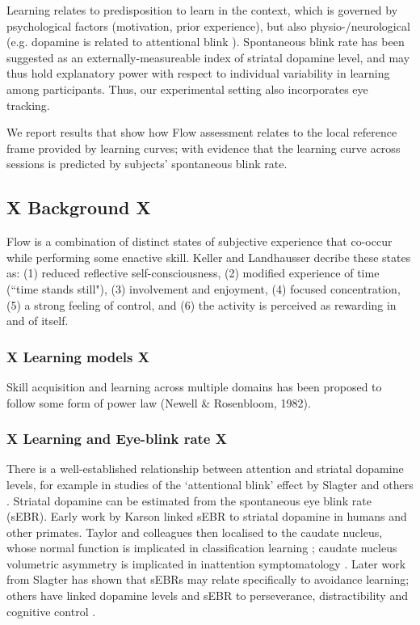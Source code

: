 \documentclass[fleqn,10pt]{wlscirep}
\begin{document}
Learning relates to predisposition to learn in the context, which is governed by psychological factors (motivation, prior experience), but also physio-/neurological (e.g. dopamine is related to attentional blink \cite{Slagter2012}). Spontaneous blink rate has been suggested as an externally-measureable index of striatal dopamine level, and may thus hold explanatory power with respect to individual variability in learning among participants. Thus, our experimental setting also incorporates eye tracking.

We report results that show how Flow assessment relates to the local reference frame provided by learning curves; with evidence that the learning curve across sessions is predicted by subjects' spontaneous blink rate.


\subsection{X Background X}
Flow is a combination of distinct states of subjective experience that co-occur while performing some enactive skill. Keller and Landhausser \cite{Keller2012} decribe these states as: (1) reduced reflective self-consciousness, (2) modified experience of time (``time stands still"), (3) involvement and enjoyment, (4) focused concentration, (5) a strong feeling of control, and (6) the activity is perceived as rewarding in and of itself.

\subsubsection{X Learning models X}
Skill acquisition and learning across multiple domains has been proposed to follow some form of power law (Newell \& Rosenbloom, 1982).%

\subsubsection{X Learning and Eye-blink rate X}
There is a well-established relationship between attention and striatal dopamine levels, for example in studies of the `attentional blink' effect by Slagter and others \cite{Slagter2012,COLZATO2008}. Striatal dopamine can be estimated from the spontaneous eye blink rate (sEBR). Early work by Karson \cite{Karson1983} linked sEBR to striatal dopamine in humans and other primates. Taylor and colleagues \cite{Taylor1999} then localised to the caudate nucleus, whose normal function is implicated in classification learning \cite{Seger2005}; caudate nucleus volumetric asymmetry is implicated in inattention symptomatology \cite{Schrimsher2002}. Later work from Slagter \cite{Slagter2015} has shown that sEBRs may relate specifically to avoidance learning; others have linked dopamine levels and sEBR to perseverance, distractibility and cognitive control \cite{Muller2007,Dreisbach2005}.
\end{document}
